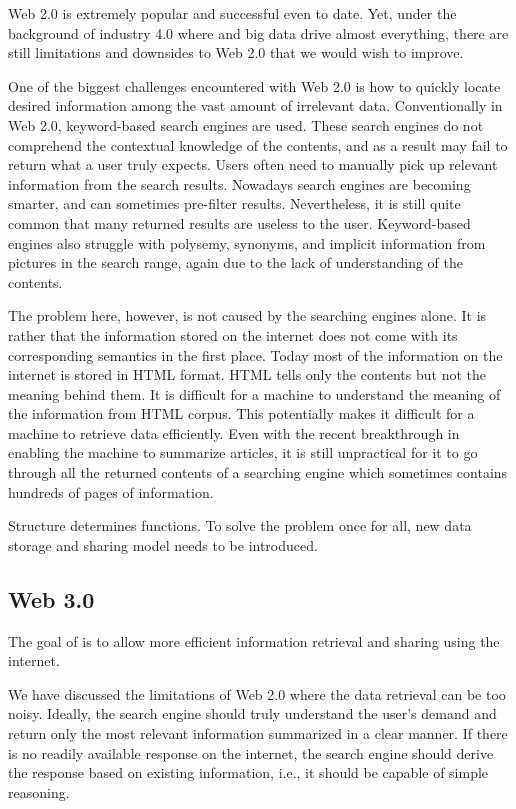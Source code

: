 Web 2.0 is extremely popular and successful even to date. Yet, under the background of industry 4.0 where  and big data drive almost everything, there are still limitations and downsides to Web 2.0 that we would wish to improve.

One of the biggest challenges encountered with Web 2.0 is how to quickly locate desired information among the vast amount of irrelevant data. Conventionally in Web 2.0, keyword-based search engines are used. These search engines do not comprehend the contextual knowledge of the contents, and as a result may fail to return what a user truly expects. Users often need to manually pick up relevant information from the search results. Nowadays search engines are becoming smarter, and can sometimes pre-filter results. Nevertheless, it is still quite common that many returned results are useless to the user. Keyword-based engines also struggle with polysemy, synonyms, and implicit information from pictures in the search range, again due to the lack of understanding of the contents.

The problem here, however, is not caused by the searching engines alone.  It is rather that the information stored on the internet does not come with its corresponding semantics in the first place. Today most of the information on the internet is stored in HTML format. HTML tells only the contents but not the meaning behind them. It is difficult for a machine to understand the meaning of the information from HTML corpus. This potentially makes it difficult for a machine to retrieve data efficiently. Even with the recent breakthrough in  enabling the machine to summarize articles, it is still unpractical for it to go through all the returned contents of a searching engine which sometimes contains hundreds of pages of information.

Structure determines functions. To solve the problem once for all, new data storage and sharing model needs to be introduced.

\subsection{Web 3.0}

The goal of  is to allow more efficient information retrieval and sharing using the internet. 

We have discussed the limitations of Web 2.0 where the data retrieval can be too noisy. Ideally, the search engine should truly understand the user's demand and return only the most relevant information summarized in a clear manner. If there is no readily available response on the internet, the search engine should derive the response based on existing information, i.e., it should be capable of simple reasoning. 

